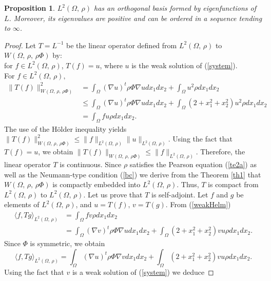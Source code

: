 \documentclass[11pt]{article}
\newtheorem{proposition}[theorem]{Proposition}
\begin{document}
	\begin{proposition}
		$L^2(\Omega,\,\rho )$ has an orthogonal basis formed by eigenfunctions of $L$. Moreover, its eigenvalues are positive and can be ordered in a sequence tending to $\infty$.
	\end{proposition}
	\begin{proof}
		Let $T=L^{-1}$ be the linear operator defined from $L^2(\Omega,\,\rho )$ to $W\left(\Omega,\,\rho ,\,\rho \Phi\right)$ by:\\ for $f\in L^2(\Omega,\,\rho )$, $T(f)=u$, where $u$ is the weak solution of (\ref{system}).\\For $f\in L^2(\Omega,\,\rho ),$
		\begin{align*}
			\|T(f)\|_{W\left(\Omega,\,\rho ,\,\rho \Phi\right)}^2&=\int_{\Omega}(\nabla u)^t\rho \Phi\nabla udx_1dx_2+\int_{\Omega}u^2\rho dx_1dx_2\\
			&\leq  \int_{\Omega}(\nabla u)^t\rho \Phi\nabla udx_1dx_2+\int_{\Omega}\left(2+{x_1^2+x_2^2}\right)u^2\rho dx_1dx_2\\
			&=\int_{\Omega}fu\rho dx_1dx_2.
		\end{align*}
		The use of the H\"older inequality yields 
		$\|T(f)\|_{W\left(\Omega,\,\rho ,\,\rho \Phi\right)}^2\leq \|f\|_{L^2(\Omega,\,\rho )}\|u\|_{L^2(\Omega,\,\rho )}$. Using the fact that $T(f)=u$, we obtain $\|T(f)\|_{W\left(\Omega,\,\rho ,\,\rho \Phi\right)}\leq \|f\|_{L^2(\Omega,\,\rho )}$. Therefore, the linear operator $T$ is continuous. Since $\rho $ satisfies the Pearson equation (\ref{te2a}) as well as the Neumann-type condition (\ref{bc}) we derive from the Theorem \ref{th1} that $W\left(\Omega,\,\rho ,\,\rho \Phi\right)$ is compactly embedded into $L^2(\Omega,\,\rho )$. Thus, $T$ is compact from $L^2(\Omega,\,\rho )$ to $L^2(\Omega,\,\rho ).$ Let us prove that $T$  is self-adjoint. Let  $f$ and $g$ be elements of  $L^2(\Omega,\,\rho )$, and $u=T(f),\,v=T(g)$. From (\ref{weakHelm})
		\begin{align*}
			\langle f,Tg\rangle_{L^2\left(\Omega,\,\rho \right)}&=\int_{\Omega}fv\rho dx_1dx_2\\
			&=\int_{\Omega}(\nabla v)^t\rho \Phi\nabla udx_1dx_2+\int_{\Omega}\left(2+{x_1^2+x_2^2}\right)vu\rho dx_1dx_2.
		\end{align*}
		Since $\Phi$ is symmetric, we obtain 
		$$\langle f,Tg\rangle_{L^2\left(\Omega,\,\rho \right)}=\int_{\Omega}(\nabla u)^t\rho \Phi\nabla vdx_1dx_2+\int_{\Omega}\left(2+{x_1^2+x_2^2}\right)vu\rho dx_1dx_2.$$
		Using the fact that $v$ is a weak solution of (\ref{system}) we deduce

\end{proof}
\end{document}
